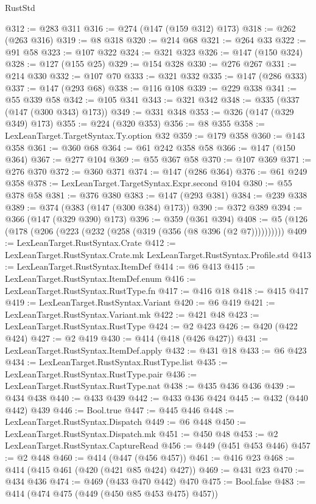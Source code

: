 \begin{lexlean}{RustStd}
\begin{coremodule}
@312 := @283 @311
@316 := @274 (@147 (@159 @312) @173)
@318 := @262 (@263 @316)
@319 := @8 @318
@320 := @214 @68
@321 := @264 @33
@322 := @91 @58
@323 := @107 @322
@324 := @321 @323
@326 := @147 (@150 @324)
@328 := @127 (@155 @25)
@329 := @154 @328
@330 := @276 @267
@331 := @214 @330
@332 := @107 @70
@333 := @321 @332
@335 := @147 (@286 @333)
@337 := @147 (@293 @68)
@338 := @116 @108
@339 := @229 @338
@341 := @55 @339 @58
@342 := @105 @341
@343 := @321 @342
@348 := @335 (@337 (@147 (@300 @343) @173))
@349 := @331 @348
@353 := @326 (@147 (@329 @349) @173)
@355 := @224 (@320 @353)
@356 := @8 @355
@358 := LexLeanTarget.TargetSyntax.Ty.option @32
@359 := @179 @358
@360 := @143 @358
@361 := @360 @68
@364 := @61 @242 @358 @58
@366 := @147 (@150 @364)
@367 := @277 @104
@369 := @55 @367 @58
@370 := @107 @369
@371 := @276 @370
@372 := @360 @371
@374 := @147 (@286 @364)
@376 := @61 @249 @358
@378 := LexLeanTarget.TargetSyntax.Expr.second @104
@380 := @55 @378 @58
@381 := @376 @380
@383 := @147 (@293 @381)
@384 := @239 @338
@389 := @374 (@383 (@147 (@300 @384) @173))
@390 := @372 @389
@394 := @366 (@147 (@329 @390) @173)
@396 := @359 (@361 @394)
@408 := @5 (@126 (@178 (@206 (@223 (@232 (@258 (@319 (@356 (@8 @396 (@2 @7))))))))))
@409 := LexLeanTarget.RustSyntax.Crate
@412 := LexLeanTarget.RustSyntax.Crate.mk LexLeanTarget.RustSyntax.Profile.std
@413 := LexLeanTarget.RustSyntax.ItemDef
@414 := @6 @413
@415 := LexLeanTarget.RustSyntax.ItemDef.enum
@416 := LexLeanTarget.RustSyntax.RustType.fn
@417 := @416 @18
@418 := @415 @417
@419 := LexLeanTarget.RustSyntax.Variant
@420 := @6 @419
@421 := LexLeanTarget.RustSyntax.Variant.mk
@422 := @421 @48
@423 := LexLeanTarget.RustSyntax.RustType
@424 := @2 @423
@426 := @420 (@422 @424)
@427 := @2 @419
@430 := @414 (@418 (@426 @427))
@431 := LexLeanTarget.RustSyntax.ItemDef.apply
@432 := @431 @18
@433 := @6 @423
@434 := LexLeanTarget.RustSyntax.RustType.list
@435 := LexLeanTarget.RustSyntax.RustType.pair
@436 := LexLeanTarget.RustSyntax.RustType.nat
@438 := @435 @436 @436
@439 := @434 @438
@440 := @433 @439
@442 := @433 @436 @424
@445 := @432 (@440 @442) @439
@446 := Bool.true
@447 := @445 @446
@448 := LexLeanTarget.RustSyntax.Dispatch
@449 := @6 @448
@450 := LexLeanTarget.RustSyntax.Dispatch.mk
@451 := @450 @48
@453 := @2 LexLeanTarget.RustSyntax.CaptureRead
@456 := @449 (@451 @453 @446)
@457 := @2 @448
@460 := @414 (@447 (@456 @457))
@461 := @416 @23
@468 := @414 (@415 @461 (@420 (@421 @85 @424) @427))
@469 := @431 @23
@470 := @434 @436
@474 := @469 (@433 @470 @442) @470
@475 := Bool.false
@483 := @414 (@474 @475 (@449 (@450 @85 @453 @475) @457))

\end{coremodule}
\end{lexlean}
